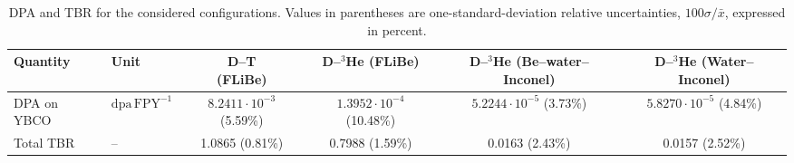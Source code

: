 \begin{table}[!h]
\centering
\caption{DPA and TBR for the considered configurations. Values in parentheses are one-standard-deviation relative uncertainties,
$100\sigma/\bar{x}$, expressed in percent.}
\label{tab:DPA_TBR}

\begin{tabular}{@{}llcccc@{}}
\toprule
Quantity
& Unit
& \makecell{D--T\\(FLiBe)}
& \makecell{D--$^3$He\\(FLiBe)}
& \makecell{D--$^3$He\\(Be--water--\\Inconel)}
& \makecell{D--$^3$He\\(Water--\\Inconel)}
\\
\midrule

DPA on YBCO
& $\mathrm{dpa\,FPY^{-1}}$
& $8.2411\cdot 10^{-3}$ (5.59\%)
& $1.3952\cdot 10^{-4}$ (10.48\%)
& $5.2244\cdot 10^{-5}$ (3.73\%)
& $5.8270\cdot 10^{-5}$ (4.84\%)
\\

\midrule
Total TBR
& --
& 1.0865 (0.81\%)
& 0.7988 (1.59\%)
& 0.0163 (2.43\%)
& 0.0157 (2.52\%)
\\

\bottomrule
\end{tabular}
\end{table}
